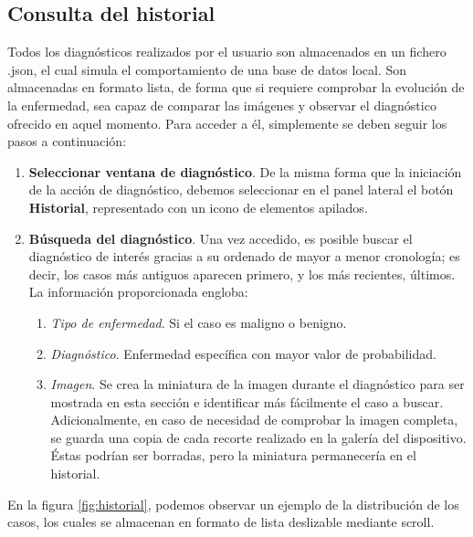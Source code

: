  
 \subsection{Consulta del historial}
 
 Todos los diagnósticos realizados por el usuario son almacenados en un fichero .json, el cual simula el comportamiento de una base de datos local. Son almacenadas en formato lista, de forma que si requiere comprobar la evolución de la enfermedad, sea capaz de comparar las imágenes y observar el diagnóstico ofrecido en aquel momento.  Para acceder a él, simplemente se deben seguir los pasos a continuación:
 
 \begin{enumerate}
 	\item \textbf{Seleccionar ventana de diagnóstico}. De la misma forma que la iniciación de la acción de diagnóstico, debemos seleccionar en el panel lateral el botón \textbf{Historial}, representado con un icono de elementos apilados.
 	\item \textbf{Búsqueda del diagnóstico}. Una vez accedido, es posible buscar el diagnóstico de interés gracias a su ordenado de mayor a menor cronología; es decir, los casos más antiguos aparecen primero, y los más recientes, últimos. La información proporcionada engloba:
 	\begin{enumerate}
 		\item \textit{Tipo de enfermedad}. Si el caso es maligno o benigno.
 		\item \textit{Diagnóstico}. Enfermedad específica con mayor valor de probabilidad.
 		\item \textit{Imagen}. Se crea la miniatura de la imagen durante el diagnóstico para ser mostrada en esta sección e identificar más fácilmente el caso a buscar. Adicionalmente, en caso de necesidad de comprobar la imagen completa, se guarda una copia de cada recorte realizado en la galería del dispositivo. Éstas podrían ser borradas, pero la miniatura permanecería en el historial.
 	\end{enumerate}
 \end{enumerate}
 
 En la figura \ref{fig:historial}, podemos observar un ejemplo de la distribución de los casos, los cuales se almacenan en formato de lista deslizable mediante scroll.
 
